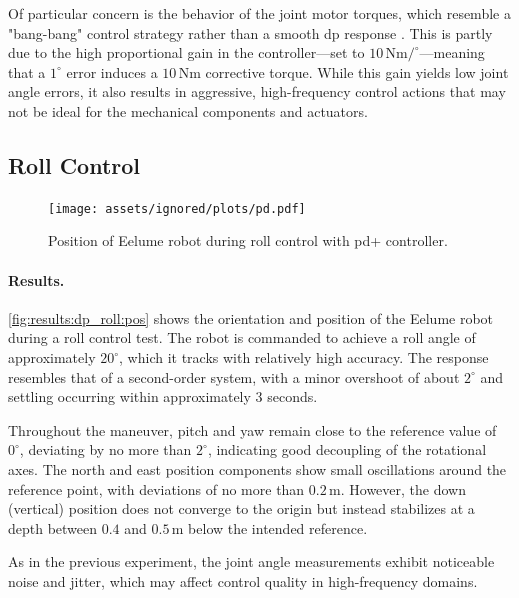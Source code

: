Of particular concern is the behavior of the joint motor torques, which 
resemble a "bang-bang" control strategy rather than a smooth \gls{dp} response
. This is partly due to the high proportional gain in the controller—set to
\(10\,\mathrm{Nm}/^\circ\)—meaning that a \(1^\circ\) error induces a 
\(10\,\mathrm{Nm}\) corrective torque. While this gain yields low joint angle 
errors, it also results in aggressive, high-frequency control actions that may 
not be ideal for the mechanical components and actuators.

\FloatBarrier

\subsection{Roll Control}

\begin{figure}[!ht]
    \centering
    \texttt{[image: assets/ignored/plots/pd.pdf]}
    \caption{Position of Eelume robot during roll control with \gls{pd+} controller.}
    \label{fig:results:dp_roll:pos}
\end{figure}

\paragraph{Results.}

\autoref{fig:results:dp_roll:pos} shows the orientation and position of the 
Eelume robot during a roll control test. The robot is commanded to achieve a 
roll angle of approximately \(20^\circ\), which it tracks with relatively high 
accuracy. The response resembles that of a second-order system, with a minor 
overshoot of about \(2^\circ\) and settling occurring within approximately
\(3\) seconds.

Throughout the maneuver, pitch and yaw remain close to the reference value of
\(0^\circ\), deviating by no more than \(2^\circ\), indicating good decoupling 
of the rotational axes. The north and east position components show small 
oscillations around the reference point, with deviations of no more than
\(0.2\,\mathrm{m}\). However, the down (vertical) position does not converge 
to the origin but instead stabilizes at a depth between \(0.4\) and
\(0.5\,\mathrm{m}\) below the intended reference.

As in the previous experiment, the joint angle measurements exhibit noticeable 
noise and jitter, which may affect control quality in high-frequency domains.

